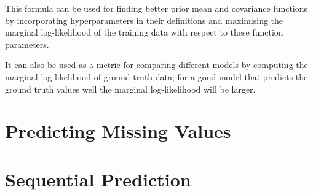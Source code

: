 \documentclass{article}
\begin{document}
            This formula can be used for finding better prior mean and covariance functions by incorporating hyperparameters in their definitions and maximising the marginal log-likelihood of the training data with respect to these function parameters.

            It can also be used as a metric for comparing different models by computing the marginal log-likelihood of ground truth data; for a good model that predicts the ground truth values well the marginal log-likelihood will be larger.
            
    \section{Predicting Missing Values}

    \section{Sequential Prediction}
\end{document}
